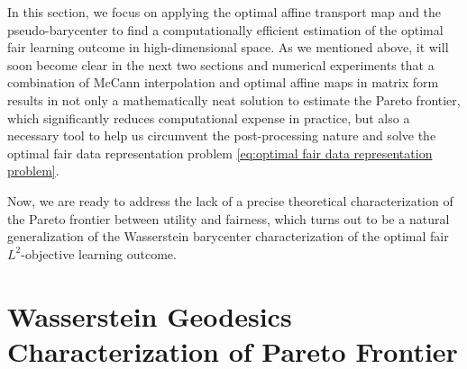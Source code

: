 \documentclass[twoside,11pt]{article}
\newcommand{\edit}[1]{\textcolor{blue}{#1}}
\begin{document}


In this section, we focus on applying the optimal affine transport map and the pseudo-barycenter to find a computationally efficient estimation of the optimal fair learning outcome in high-dimensional space. As we mentioned above, it will soon become clear in the next two sections and numerical experiments that a combination of McCann interpolation and optimal affine maps in matrix form results in not only a mathematically neat solution to estimate the Pareto frontier, which significantly reduces computational expense in practice, but also a necessary tool to help us circumvent the post-processing nature and solve the optimal fair data representation problem \eqref{eq:optimal fair data representation problem}. 

Now, we are ready to address the lack of a  precise theoretical characterization of the Pareto frontier between utility and fairness, which turns out to be a natural generalization of the Wasserstein barycenter characterization of the optimal fair $L^2$-objective learning outcome.

\section{Wasserstein Geodesics Characterization of Pareto Frontier} \label{s:Pareto Frontier}
\end{document}
